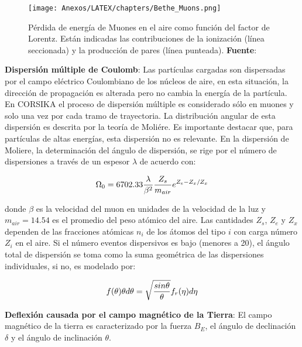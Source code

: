 \begin{figure}[H]
        \begin{center}
        \texttt{[image: Anexos/LATEX/chapters/Bethe\_Muons.png]}
        \end{center}
        \caption[Ecuación de Bethe-Bloch para los muones.]{Pérdida de energía de Muones en el aire como función del factor de Lorentz. Están indicadas las contribuciones de la ionización (línea seccionada) y la producción de pares (línea punteada).  \textbf{Fuente}: \cite[][10]{Heck1998}}
        \label{fig:fig4}
\end{figure}

\textbf{Dispersión múltiple de Coulomb}: Las partículas cargadas son dispersadas por el campo eléctrico Coulombiano de los núcleos de aire, en esta situación, la dirección de propagación es alterada pero no cambia la energía de la partícula. En CORSIKA el proceso de dispersión múltiple es considerado sólo en muones y solo una vez por cada tramo de trayectoria. La distribución angular de esta dispersión es descrita por la teoría de Moliére. Es importante destacar que, para partículas de altas energías, esta dispersión no es relevante. En la dispersión de Moliere, la determinación del ángulo de dispersión, se rige por el número de dispersiones a través de un espesor $\lambda$ de acuerdo con:

\begin{equation}
\centering
\Omega_{0} = 6702.33 \frac{\lambda}{\beta^{2}} \frac{Z_{s}}{m_{air}}e^{Z_{e}-Z_{x} /Z_{x}}
\label{eq:eq21}
\end{equation}

donde $\beta$ es la velocidad del muon en unidades de la velocidad de la luz y $m_{air} = 14.54$ es el promedio del peso atómico del aire. Las cantidades $Z_{s}$, $Z_{e}$ y $Z_{x}$ dependen de las fracciones atómicas $n_{i}$ de los átomos del tipo $i$ con carga número $Z_{i}$ en el aire. Si el número eventos dispersivos es bajo (menores a 20), el ángulo total de dispersión se toma como la suma geométrica de las dispersiones individuales, si no, es modelado por:

\begin{equation}
\centering
f(\theta) \theta d\theta = \sqrt{\frac{sin\theta}{\theta}} f_{r}(\eta) d \eta
\label{eq:eq22}
\end{equation}

\textbf{Deflexión causada por el campo magnético de la Tierra}:  El campo magnético de la tierra es caracterizado por la fuerza $B_{E}$, el ángulo de declinación $\delta$ y el ángulo de inclinación $\theta$. 

